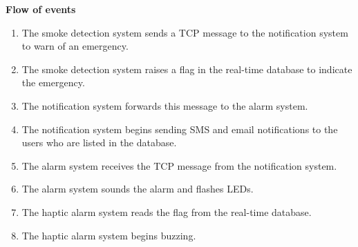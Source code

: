 \textbf{Flow of events}
\begin{enumerate}
    \item The smoke detection system sends a TCP message to the notification system to warn of an emergency.
    \item The smoke detection system raises a flag in the real-time database to indicate the emergency.
    \item The notification system forwards this message to the alarm system.
    \item The notification system begins sending SMS and email notifications to the users who are listed in the database.
    \item The alarm system receives the TCP message from the notification system.
    \item The alarm system sounds the alarm and flashes LEDs.
    \item The haptic alarm system reads the flag from the real-time database.
    \item The haptic alarm system begins buzzing.
\end{enumerate}
